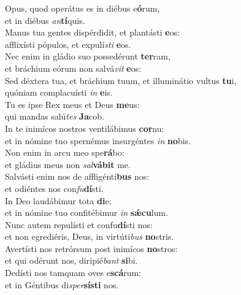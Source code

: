 \evenverse Opus, quod operátus es in diébus e\textbf{ó}rum,~\*\\
\evenverse et in diébus \textit{an}\textbf{tí}quis.\\
\oddverse Manus tua gentes dispérdidit, et plantásti \textbf{e}os:~\*\\
\oddverse afflixísti pópulos, et expulí\textit{sti} \textbf{e}os.\\
\evenverse Nec enim in gládio suo possedérunt \textbf{ter}ram,~\*\\
\evenverse et bráchium eórum non salvá\textit{vit} \textbf{e}os:\\
\oddverse Sed déxtera tua, et bráchium tuum, et illuminátio vultus \textbf{tu}i,~\*\\
\oddverse quóniam complacuísti \textit{in} \textbf{e}is.\\
\evenverse Tu es ipse Rex meus et Deus \textbf{me}us:~\*\\
\evenverse qui mandas salú\textit{tes} \textbf{Ja}cob.\\
\oddverse In te inimícos nostros ventilábimus \textbf{cor}nu:~\*\\
\oddverse et in nómine tuo spernémus insurgéntes \textit{in} \textbf{no}bis.\\
\evenverse Non enim in arcu meo spe\textbf{rá}bo:~\*\\
\evenverse et gládius meus non \textit{sal}\textbf{vá}\textbf{bit} me.\\
\oddverse Salvásti enim nos de affligénti\textbf{bus} nos:~\*\\
\oddverse et odiéntes nos con\textit{fu}\textbf{dí}sti.\\
\evenverse In Deo laudábimur tota \textbf{di}e:~\*\\
\evenverse et in nómine tuo confitébimur \textit{in} \textbf{sǽ}\textbf{cu}lum.\\
\oddverse Nunc autem repulísti et confu\textbf{dí}sti nos:~\*\\
\oddverse et non egrediéris, Deus, in virtúti\textit{bus} \textbf{no}stris.\\
\evenverse Avertísti nos retrórsum post inimícos \textbf{no}stros:~\*\\
\evenverse et qui odérunt nos, diripié\textit{bant} \textbf{si}bi.\\
\oddverse Dedísti nos tamquam oves e\textbf{scá}rum:~\*\\
\oddverse et in Géntibus di\textit{sper}\textbf{sí}\textbf{sti} nos.\\
